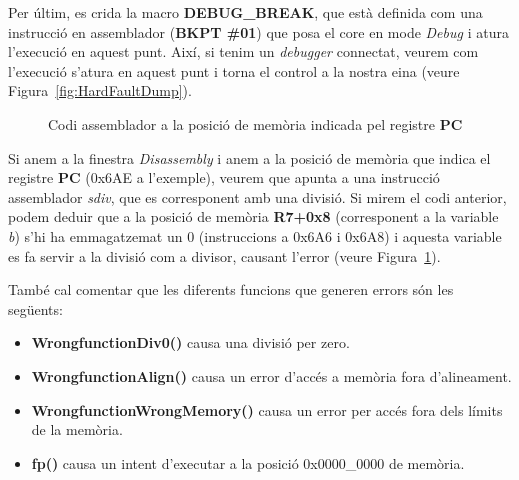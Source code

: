Per últim, es crida la macro {\bf DEBUG\_BREAK}, que està definida com una instrucció en assemblador ({\bf BKPT \#01}) que posa el core en mode {\em Debug} i atura l'execució en aquest punt. Així, si tenim un {\em debugger} connectat, veurem com l'execució s'atura en aquest punt i torna el control a la nostra eina (veure Figura~\ref{fig:HardFaultDump}).


\begin{figure}
 \centering
 \caption{Codi assemblador a la posició de memòria indicada pel registre {\bf PC}}
 \label{fig:HardFaultDis}
\end{figure}

Si anem a la finestra {\em Disassembly} i anem a la posició de memòria que indica el registre {\bf PC} (0x6AE a l'exemple), veurem que apunta a una instrucció assemblador {\em sdiv}, que es corresponent amb una divisió. Si mirem el codi anterior, podem deduir que a la posició de memòria {\bf R7+0x8} (corresponent a la variable {\em b}) s'hi ha emmagatzemat un 0 (instruccions a 0x6A6 i 0x6A8) i aquesta variable es fa servir a la divisió com a divisor, causant l'error (veure Figura~\ref{fig:HardFaultDis}).

També cal comentar que les diferents funcions que generen errors són les següents:
\begin{itemize}
 \item {\bf WrongfunctionDiv0()} causa una divisió per zero.
 \item {\bf WrongfunctionAlign()} causa un error d'accés a memòria fora d'alineament.
 \item {\bf WrongfunctionWrongMemory()} causa un error per accés fora dels límits de la memòria.
 \item {\bf fp()} causa un intent d'executar a la posició 0x0000\_0000 de memòria.
\end{itemize}


